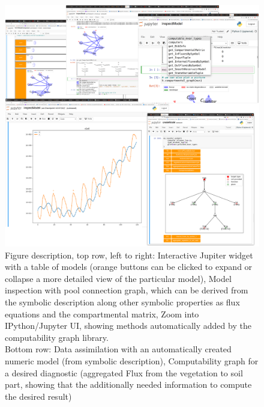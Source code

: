 \begin{figure}[h]
\includegraphics[width=\columnwidth]{TabScreenCombined.pdf}
  \caption{
      Figure description, top row, left to right: Interactive Jupiter widget
      with a table of models (orange buttons can be clicked to expand or
      collapse a more detailed view of the particular model), Model inspection
      with pool connection graph, which can be derived from the symbolic
      description along other symbolic properties as flux equations and the
      compartmental matrix, Zoom into IPython/Jupyter UI, showing methods
      automatically added by the computability graph library.  \\ Bottom row:
      Data assimilation with an automatically created numeric model (from
      symbolic description), Computability graph for a desired diagnostic
      (aggregated Flux from the vegetation to soil part, showing that the
      additionally needed information to compute the desired result)
  }
  \label{fig:overview}
\end{figure}

